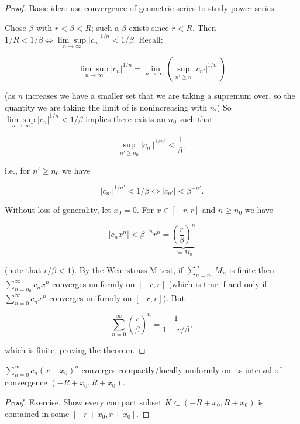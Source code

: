 \begin{proof}

Basic idea: use convergence of geometric series to study power series.

Chose \(\beta\) with \(r < \beta < R\); such a \(\beta\) exists since \(r < R\). Then \(1/R < 1/\beta \iff \underset{n \to \infty}{\lim \sup} |c_n|^{1/n} < 1/\beta\). Recall:

\[
\underset{n \to \infty}{\lim \sup} |c_n|^{1/n} = \lim_{n \to \infty} \left( \sup_{n' \geq n} |c_{n'}|^{1/n'} \right)
\]

(as \(n\) increases we have a smaller set that we are taking a supremum over, so the quantity we are taking the limit of is nonincreasing with \(n\).) So \(\underset{n \to \infty}{\lim \sup} |c_n|^{1/n} < 1/\beta\) implies there exists an \(n_0\) such that 

\[
\sup_{n' \geq n_0} |c_{n'}|^{1/n'} < \frac{1}{\beta};
\]

i.e., for \(n' \geq n_0\) we have 

\[
|c_{n'}|^{1/n'} < 1/\beta \iff |c_{n'}| < \beta^{-n'}.
\]

Without loss of generality, let \(x_0 = 0\).  For \(x \in [-r, r]\) and \(n \geq n_0\) we have

\[
| c_n x^n| < \beta^{-n} r^n = \underbrace{ \left( \frac{r}{\beta} \right)^n}_{:= M_n}
\]

(note that \(r/\beta < 1\)). By the Weierstrass M-test, if \(\sum_{n=n_0}^\infty M_n\) is finite then \(\sum_{n=n_0}^\infty c_n x^n\) converges uniformly on \([-r,r]\) (which is true if and only if \(\sum_{n=0}^\infty c_n x^n\) converges uniformly on \([-r,r]\)). But 

\[
\sum_{n=0}^\infty  \left( \frac{r}{\beta} \right)^n= \frac{1}{1 - r/\beta},
\]

which is finite, proving the theorem.

\end{proof}

\begin{corollary}

\(\sum_{n=0}^\infty c_n(x- x_0)^n\) converges compactly/locally uniformly on its interval of convergence \((-R + x_0, R + x_0)\).

\end{corollary}

\begin{proof}

Exercise. Show every compact subset \(K \subset (-R + x_0, R+ x_0)\) is contained in some \([-r + x_0, r+ x_0]\). 

\end{proof}

